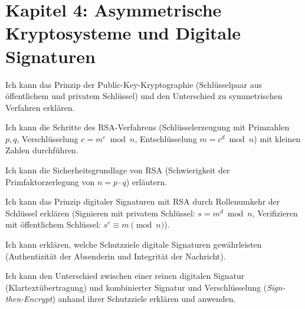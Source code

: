 \section*{Kapitel 4: Asymmetrische Kryptosysteme und Digitale Signaturen}
\begin{todolist}
  \item Ich kann das Prinzip der Public-Key-Kryptographie (Schlüsselpaar aus öffentlichem und privatem Schlüssel) und den Unterschied zu symmetrischen Verfahren erklären.
  \item Ich kann die Schritte des \gls{RSA}-Verfahrens (Schlüsselerzeugung mit Primzahlen $p, q$, Verschlüsselung $c = m^e \bmod n$, Entschlüsselung $m = c^d \bmod n$) mit kleinen Zahlen durchführen.
  \item Ich kann die Sicherheitsgrundlage von \gls{RSA} (Schwierigkeit der Primfaktorzerlegung von $n = p \cdot q$) erläutern.
  \item Ich kann das Prinzip digitaler Signaturen mit \gls{RSA} durch Rollenumkehr der Schlüssel erklären (Signieren mit privatem Schlüssel: $s = m^d \bmod n$, Verifizieren mit öffentlichem Schlüssel: $s^e \equiv m \pmod n$).
  \item Ich kann erklären, welche Schutzziele digitale Signaturen gewährleisten (Authentizität der Absenderin und Integrität der Nachricht).
  \item Ich kann den Unterschied zwischen einer reinen digitalen Signatur (Klartextübertragung) und kombinierter Signatur und Verschlüsselung (\emph{Sign-then-Encrypt}) anhand ihrer Schutzziele erklären und anwenden.
\end{todolist}

